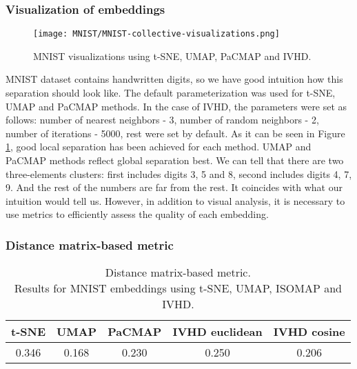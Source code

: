 \documentclass[12pt]{article}
\begin{document}
\subsubsection{Visualization of embeddings}
\begin{figure}[h]
    \centering
    \texttt{[image: MNIST/MNIST-collective-visualizations.png]}
    \caption{MNIST visualizations using t-SNE, UMAP, PaCMAP and IVHD.}
    \label{fig:mnist_visualization}
\end{figure}
\clearpage
MNIST dataset contains handwritten digits, so we have good intuition how this separation should look like. The default parameterization was used for t-SNE, UMAP and PaCMAP methods. In the case of IVHD, the parameters were set as follows: number of nearest neighbors - 3, number of random neighbors - 2, number of iterations - 5000, rest were set by default. As it can be seen in Figure \ref{fig:mnist_visualization}, good local separation has been achieved for each method. UMAP and PaCMAP methods reflect global separation best. We can tell that there are two three-elements clusters: first includes digits 3, 5 and 8, second includes digits 4, 7, 9. And the rest of the numbers are far from the rest. It coincides with what our intuition would tell us. However, in addition to visual analysis, it is necessary to use metrics to efficiently assess the quality of each embedding.

\subsubsection{Distance matrix-based metric}
\begin{table}[h]
\centering
\caption{Distance matrix-based metric. \\ Results for MNIST embeddings using t-SNE, UMAP, ISOMAP and IVHD.}
\begin{tabular}{|c|c|l|l|l|}
\hline
\textbf{t-SNE} & \textbf{UMAP} & \textbf{PaCMAP}            & \textbf{IVHD euclidean}    & \textbf{IVHD cosine}       \\ \hline
0.346          & 0.168         & \multicolumn{1}{c|}{0.230} & \multicolumn{1}{c|}{0.250} & \multicolumn{1}{c|}{0.206} \\ \hline
\end{tabular}
\end{table}
\end{document}
